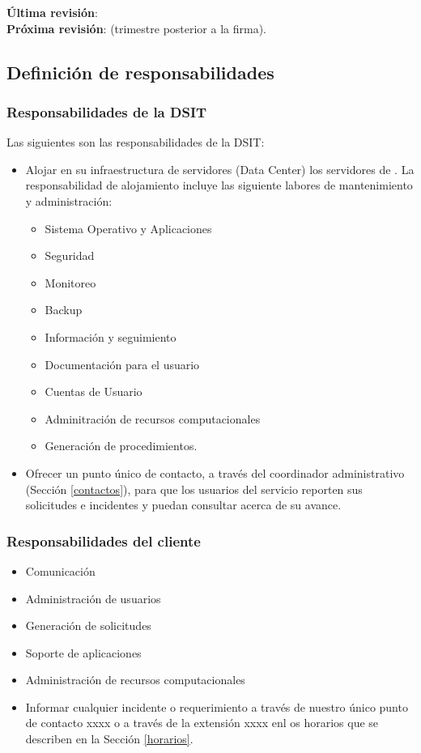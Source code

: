 {\bf \'Ultima revisi\'on}: \\

{\bf Pr\'oxima revisi\'on}: (trimestre posterior a la firma).

\subsection{Definici\'on de responsabilidades}

\subsubsection{Responsabilidades de la DSIT}
Las siguientes son las responsabilidades de la DSIT:
\begin{itemize}
\item Alojar en su infraestructura de servidores (Data Center) los
  servidores de \icar. La responsabilidad de alojamiento incluye las
  siguiente labores de mantenimiento y administraci\'on:
  \begin{itemize}
  \item Sistema Operativo y Aplicaciones
  \item Seguridad
  \item Monitoreo
  \item Backup
  \item Informaci\'on y seguimiento
  \item Documentaci\'on para el usuario
  \item Cuentas de Usuario
  \item Adminitraci\'on de recursos computacionales
  \item Generaci\'on de procedimientos.
  \end{itemize}
\item Ofrecer un punto \'unico de contacto, a trav\'es del coordinador
  administrativo (Secci\'on \ref{contactos}), para que los usuarios
  del servicio reporten sus solicitudes e incidentes y puedan
  consultar acerca de su avance.
\end{itemize}

\subsubsection{Responsabilidades del cliente}

\begin{itemize}
  \item Comunicaci\'on
\item Administraci\'on de usuarios
\item Generaci\'on de solicitudes
\item Soporte de aplicaciones
\item Administraci\'on de recursos computacionales
\item Informar cualquier incidente o requerimiento a trav\'es de
  nuestro \'unico punto de contacto xxxx o a trav\'es de la
  extensi\'on xxxx enl os horarios que se describen en la Secci\'on
  \ref{horarios}. 
\end{itemize}


